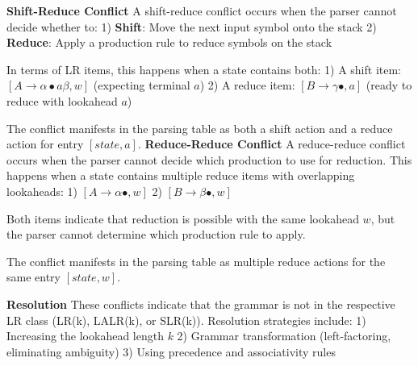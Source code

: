 \textbf{Shift-Reduce Conflict}
A shift-reduce conflict occurs when the parser cannot decide whether to:
1) \textbf{Shift}: Move the next input symbol onto the stack
2) \textbf{Reduce}: Apply a production rule to reduce symbols on the stack


In terms of LR items, this happens when a state contains both:
1) A shift item: $[A \to \alpha \bullet a \beta, w]$ (expecting terminal $a$)
2) A reduce item: $[B \to \gamma \bullet, a]$ (ready to reduce with lookahead $a$)


The conflict manifests in the parsing table as both a shift action and a reduce action for entry $[state, a]$.
\textbf{Reduce-Reduce Conflict}
A reduce-reduce conflict occurs when the parser cannot decide which production to use for reduction. This happens when a state contains multiple reduce items with overlapping lookaheads:
1) $[A \to \alpha \bullet, w]$
2) $[B \to \beta \bullet, w]$


Both items indicate that reduction is possible with the same lookahead $w$, but the parser cannot determine which production rule to apply.

The conflict manifests in the parsing table as multiple reduce actions for the same entry $[state, w]$.

\textbf{Resolution}
These conflicts indicate that the grammar is not in the respective LR class (LR(k), LALR(k), or SLR(k)). Resolution strategies include:
1) Increasing the lookahead length $k$
2) Grammar transformation (left-factoring, eliminating ambiguity)
3) Using precedence and associativity rules
